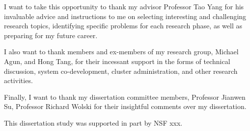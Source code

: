 \begin{acknowledgements}
I want to take this opportunity to thank my advisor Professor Tao Yang for 
his invaluable advice and instructions to me on selecting interesting and challenging
research topics, identifying specific problems for each research phase, 
as well as preparing for my future career.

I also want to thank members and ex-members of my research group, Michael Agun, and 
Hong Tang, for their incessant support in the forms of technical discussion, 
system co-development, cluster administration, and other research activities.

Finally, I want to thank my dissertation committee members, Professor 
Jianwen Su, Professor Richard Wolski 
for their insightful comments over my dissertation. 

This dissertation study was supported in part by NSF xxx.
\end{acknowledgements}
